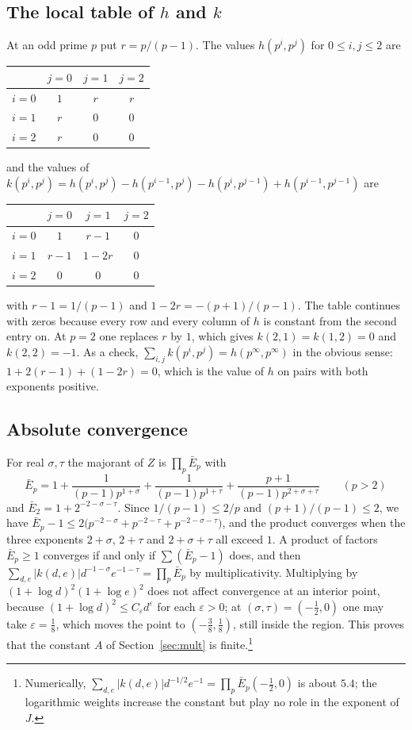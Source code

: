 \documentclass{amsart}
\theoremstyle{definition}
\theoremstyle{remark}
\numberwithin{equation}{section}
\begin{document}
\subsection{The local table of \texorpdfstring{$h$}{h} and \texorpdfstring{$k$}{k}}\label{app:table}
At an odd prime $p$ put $r=p/(p-1)$. The values $h(p^i,p^j)$ for $0\le i,j\le2$ are
\begin{center}
\begin{tabular}{c|ccc}
 & $j=0$ & $j=1$ & $j=2$\\ \hline
$i=0$ & $1$ & $r$ & $r$\\
$i=1$ & $r$ & $0$ & $0$\\
$i=2$ & $r$ & $0$ & $0$
\end{tabular}
\end{center}
and the values of $k(p^i,p^j)=h(p^i,p^j)-h(p^{i-1},p^j)-h(p^i,p^{j-1})+h(p^{i-1},p^{j-1})$ are
\begin{center}
\begin{tabular}{c|ccc}
 & $j=0$ & $j=1$ & $j=2$\\ \hline
$i=0$ & $1$ & $r-1$ & $0$\\
$i=1$ & $r-1$ & $1-2r$ & $0$\\
$i=2$ & $0$ & $0$ & $0$
\end{tabular}
\end{center}
with $r-1=1/(p-1)$ and $1-2r=-(p+1)/(p-1)$. The table continues with zeros because every row and every column of $h$ is constant from the second entry on. At $p=2$ one replaces $r$ by $1$, which gives $k(2,1)=k(1,2)=0$ and $k(2,2)=-1$. As a check, $\sum_{i,j}k(p^i,p^j)=h(p^\infty,p^\infty)$ in the obvious sense: $1+2(r-1)+(1-2r)=0$, which is the value of $h$ on pairs with both exponents positive.

\subsection{Absolute convergence}\label{app:convergence}
For real $\sigma,\tau$ the majorant of $Z$ is $\prod_p\bar E_p$ with
\[
\bar E_p=1+\frac1{(p-1)p^{1+\sigma}}+\frac1{(p-1)p^{1+\tau}}+\frac{p+1}{(p-1)p^{2+\sigma+\tau}}\qquad(p>2)
\]
and $\bar E_2=1+2^{-2-\sigma-\tau}$.
Since $1/(p-1)\le2/p$ and $(p+1)/(p-1)\le2$, we have $\bar E_p-1\le2\bigl(p^{-2-\sigma}+p^{-2-\tau}+p^{-2-\sigma-\tau}\bigr)$, and the product converges when the three exponents $2+\sigma$, $2+\tau$ and $2+\sigma+\tau$ all exceed $1$. A product of factors $\bar E_p\ge1$ converges if and only if $\sum(\bar E_p-1)$ does, and then $\sum_{d,e}|k(d,e)|d^{-1-\sigma}e^{-1-\tau}=\prod_p\bar E_p$ by multiplicativity. Multiplying by $(1+\log d)^2(1+\log e)^2$ does not affect convergence at an interior point, because $(1+\log d)^2\le C_\varepsilon d^{\varepsilon}$ for each $\varepsilon>0$; at $(\sigma,\tau)=(-\frac12,0)$ one may take $\varepsilon=\frac18$, which moves the point to $(-\frac38,\frac18)$, still inside the region. This proves that the constant $A$ of Section~\ref{sec:mult} is finite.\footnote{Numerically, $\sum_{d,e}|k(d,e)|d^{-1/2}e^{-1}=\prod_p\bar E_p(-\frac12,0)$ is about $5.4$; the logarithmic weights increase the constant but play no role in the exponent of $J$.}
\end{document}
